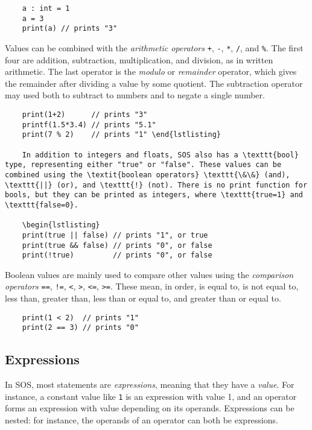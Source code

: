 \documentclass[main.tex]{subfiles}
\begin{document}
	\begin{lstlisting}
	a : int = 1
	a = 3
	print(a) // prints "3" \end{lstlisting}
	
	Values can be combined with the \textit{arithmetic operators} \texttt{+}, \texttt{-}, \texttt{*}, \texttt{/}, and \texttt{\%}. The first four are addition, subtraction, multiplication, and division, as in written arithmetic. The last operator is the \textit{modulo} or \textit{remainder} operator, which gives the remainder after dividing a value by some quotient. The subtraction operator may used both to subtract to numbers and to negate a single number.
	
	\begin{lstlisting}
	print(1+2)      // prints "3"
	printf(1.5*3.4) // prints "5.1"
	print(7 % 2)    // prints "1" \end{lstlisting}
	
	In addition to integers and floats, SOS also has a \texttt{bool} type, representing either "true" or "false". These values can be combined using the \textit{boolean operators} \texttt{\&\&} (and), \texttt{||} (or), and \texttt{!} (not). There is no print function for bools, but they can be printed as integers, where \texttt{true=1} and \texttt{false=0}.
	
	\begin{lstlisting}
	print(true || false) // prints "1", or true
	print(true && false) // prints "0", or false
	print(!true)         // prints "0", or false \end{lstlisting}
	
	Boolean values are mainly used to compare other values using the \textit{comparison operators} \texttt{==}, \texttt{!=}, \texttt{<}, \texttt{>}, \texttt{<=}, \texttt{>=}. These mean, in order, is equal to, is not equal to, less than, greater than, less than or equal to, and greater than or equal to.
	
	\begin{lstlisting}
	print(1 < 2)  // prints "1"
	print(2 == 3) // prints "0" \end{lstlisting}
	
	\subsection{Expressions}
	In SOS, most statements are \textit{expressions}, meaning that they have a \textit{value}. For instance, a constant value like \texttt{1} is an expression with value 1, and an operator forms an expression with value depending on its operands. Expressions can be nested: for instance, the operands of an operator can both be expressions. \newline
	
\end{document}
